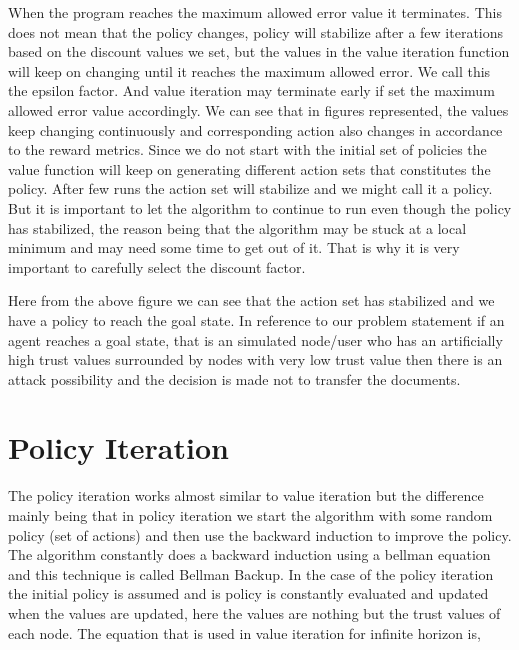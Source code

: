When the program reaches the maximum allowed error value it terminates. This
does not mean that the policy changes, policy will stabilize after a few
iterations based on the discount values we set, but the values in the value
iteration function will keep on changing until it reaches the maximum allowed
error. We call this the epsilon factor. And value iteration may terminate early
if set the maximum allowed error value accordingly.  We can see that in figures
represented, the values keep changing continuously and corresponding action also
changes in accordance to the reward metrics. Since we do not start with the
initial set of policies the value function will keep on generating different
action sets that constitutes the policy. After few runs the action set will
stabilize and we might call it a policy. But it is important to let the
algorithm to continue to run even though the policy has stabilized, the reason
being that the algorithm may be stuck at a local minimum and may need some time
to get out of it.  That is why it is very important to carefully select the
discount factor.

 
 

Here from the above figure we can see that the action set has stabilized and we
have a policy to reach the goal state. In reference to our problem statement if
an agent reaches a goal state, that is  an simulated node/user who has an
artificially high trust values surrounded by nodes with very low trust value
then there is an attack possibility and the decision is made not to transfer the
documents.

\section{Policy Iteration}

The policy iteration works almost similar to value iteration but the difference
mainly being that in policy iteration we start the algorithm with some random
policy (set of actions) and then use the backward induction to improve the
policy. The algorithm constantly does a backward induction using a bellman
equation \autocite{Wikipedia2013} and this technique is called Bellman Backup. In the case of the
policy iteration the initial policy is assumed and is policy is constantly
evaluated and updated when the values are updated, here the values are nothing
but the trust values of each node.  The equation that is used in value iteration
for infinite horizon is,  




